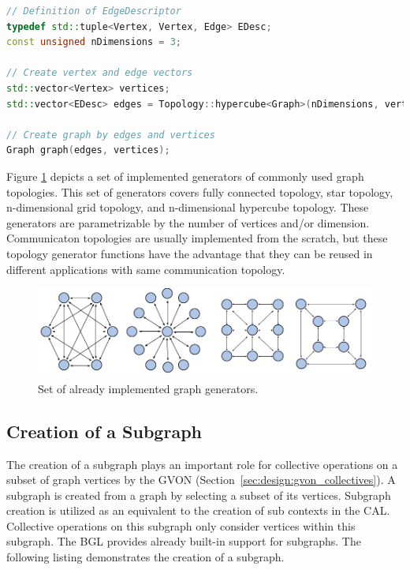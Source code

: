 \begin{minipage}[t]{\textwidth} 
\begin{lstlisting}[language=C++, label=lst:graph, caption={Generation of a three-dimensional hypercube graph. }]
// Definition of EdgeDescriptor
typedef std::tuple<Vertex, Vertex, Edge> EDesc;
const unsigned nDimensions = 3;

// Create vertex and edge vectors
std::vector<Vertex> vertices;
std::vector<EDesc> edges = Topology::hypercube<Graph>(nDimensions, vertices);

// Create graph by edges and vertices
Graph graph(edges, vertices);

\end{lstlisting}
\end{minipage}

\noindent Figure \ref{fig:topologies} depicts a set of implemented
generators of commonly used graph topologies.  This set of generators
covers fully connected topology, star topology, n-dimensional grid
topology, and n-dimensional hypercube topology.  These generators are
parametrizable by the number of vertices and/or dimension.
Communicaton topologies are usually implemented from the scratch, but
these topology generator functions have the advantage that they can be
reused in different applications with same communication topology.

\begin{figure}[H]
  \centering
  \includegraphics[width=\textwidth]{graphics/40_topologies}
  \caption{Set of already implemented graph generators.}
  \label{fig:topologies}
\end{figure}

\subsection{Creation of a Subgraph}
The creation of a subgraph plays an important role for collective
operations on a subset of graph vertices by the GVON
(Section~\ref{sec:design:gvon_collectives}). A subgraph is created
from a graph by selecting a subset of its vertices.  Subgraph creation is
utilized as an equivalent to the creation of sub contexts in the
CAL. Collective operations on this subgraph only consider vertices
within this subgraph. The BGL provides already built-in support for
subgraphs. The following listing demonstrates the creation of a
subgraph.

